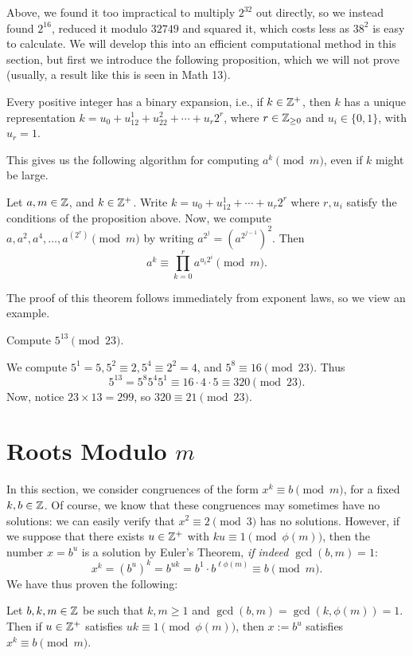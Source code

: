 \documentclass{article}
\begin{document}
Above, we found it too impractical to multiply $2^{32}$ out directly, so we instead found $2^{16}$, reduced it modulo $32749$ and squared it, which costs less as $38^2$ is easy to calculate. We will develop this into an efficient computational method in this section, but first we introduce the following proposition, which we will not prove (usually, a result like this is seen in Math 13).
\begin{proposition}
Every positive integer has a binary expansion, i.e., if $k\in\mathbb Z^+$, then $k$ has a unique representation $k = u_0 + u_12^1 + u_22^2 + \cdots + u_r2^r$, where $r\in \mathbb Z_{\geq 0}$ and $u_i\in \{0, 1\}$, with $u_r = 1$.
\end{proposition}

This gives us the following algorithm for computing $a^k \pmod m$, even if $k$ might be large.
\begin{theorem}
Let $a,m\in\mathbb Z$, and $k\in\mathbb Z^+$. Write $k = u_0 + u_12^1 + \cdots + u_r2^r$ where $r, u_i$ satisfy the conditions of the proposition above. Now, we compute $a, a^2, a^4,\ldots, a^{(2^r)}\pmod m$ by writing $a^{2^j} = (a^{2^{j-1}})^2$. Then
$$a^k \equiv \prod_{k=0}^r a^{u_i2^i} \pmod m.$$
\end{theorem}

The proof of this theorem follows immediately from exponent laws, so we view an example.
\begin{example}
Compute $5^{13}\pmod{23}$.
\end{example}
\begin{solution}
We compute $5^1 = 5, 5^2 \equiv 2, 5^4 \equiv 2^2 = 4$, and $5^8\equiv 16\pmod{23}$. Thus
$$5^{13} = 5^8 5^4 5^1 \equiv 16\cdot 4\cdot 5\equiv 320 \pmod{23}.$$
Now, notice $23\times 13 = 299$, so $320\equiv \boxed{21}\pmod{23}$.
\end{solution}

\setcounter{section}{79}
\section{Roots Modulo $m$}
In this section, we consider congruences of the form $x^k\equiv b\pmod m$, for a fixed $k,b\in \mathbb Z$. Of course, we know that these congruences may sometimes have no solutions: we can easily verify that $x^2\equiv 2\pmod 3$ has no solutions. However, if we suppose that there exists $u\in\mathbb Z^+$ with $ku\equiv 1\pmod{\phi(m)}$, then the number $x = b^u$ is a solution by Euler's Theorem, \textit{if indeed $\gcd(b, m) = 1$}:
$$x^k = (b^u)^k = b^{uk} = b^1 \cdot b^{\ell\phi(m)} \equiv b\pmod m.$$
We have thus proven the following:
\begin{theorem}
Let $b,k,m\in \mathbb Z$ be such that $k,m \geq 1$ and $\gcd(b,m) = \gcd(k, \phi(m)) = 1$. Then if $u\in\mathbb Z^+$ satisfies $uk\equiv 1\pmod{\phi(m)}$, then $x := b^u$ satisfies $x^k\equiv b\pmod m$.
\end{theorem}
\end{document}
